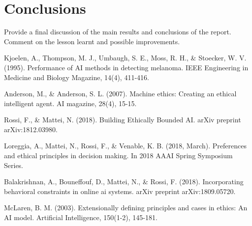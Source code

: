 \documentclass{svproc}
\begin{document}
\section{Conclusions}
Provide a final discussion of the main results and conclusions of the report. Comment on the lesson learnt and possible improvements.

\begin{thebibliography}{5}
%
Kjoelen, A., Thompson, M. J., Umbaugh, S. E., Moss, R. H., \& Stoecker, W. V. (1995). Performance of AI methods in detecting melanoma. IEEE Engineering in Medicine and Biology Magazine, 14(4), 411-416.

Anderson, M., \& Anderson, S. L. (2007). Machine ethics: Creating an ethical intelligent agent. AI magazine, 28(4), 15-15.

Rossi, F., \& Mattei, N. (2018). Building Ethically Bounded AI. arXiv preprint arXiv:1812.03980.


Loreggia, A., Mattei, N., Rossi, F., \& Venable, K. B. (2018, March). Preferences and ethical principles in decision making. In 2018 AAAI Spring Symposium Series.

Balakrishnan, A., Bouneffouf, D., Mattei, N., \& Rossi, F. (2018). Incorporating behavioral constraints in online ai systems. arXiv preprint arXiv:1809.05720.

McLaren, B. M. (2003). Extensionally defining principles and cases in ethics: An AI model. Artificial Intelligence, 150(1-2), 145-181.

\end{thebibliography}
\end{document}
